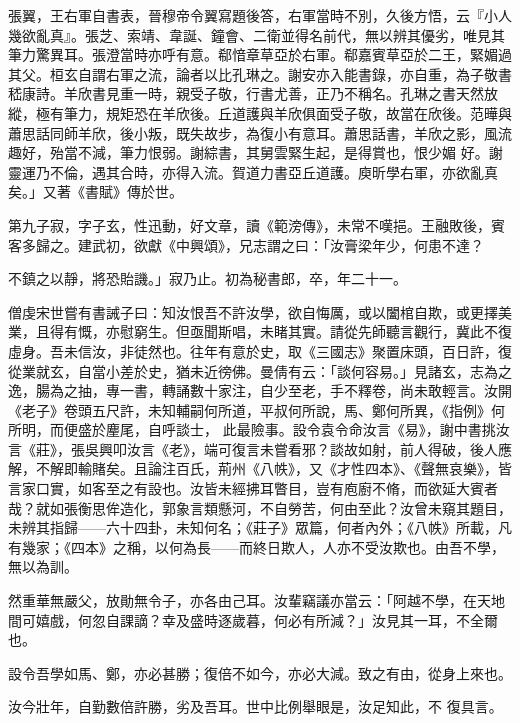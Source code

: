 \begin{pinyinscope}
 張翼，王右軍自書表，晉穆帝令翼寫題後答，右軍當時不別，久後方悟，云『小人幾欲亂真』。張芝、索靖、韋誕、鐘會、二衛並得名前代，無以辨其優劣，唯見其筆力驚異耳。張澄當時亦呼有意。郗愔章草亞於右軍。郗嘉賓草亞於二王，緊媚過其父。桓玄自謂右軍之流，論者以比孔琳之。謝安亦入能書錄，亦自重，為子敬書嵇康詩。羊欣書見重一時，親受子敬，行書尤善，正乃不稱名。孔琳之書天然放縱，極有筆力，規矩恐在羊欣後。丘道護與羊欣俱面受子敬，故當在欣後。范曄與蕭思話同師羊欣，後小叛，既失故步，為復小有意耳。蕭思話書，羊欣之影，風流趣好，殆當不減，筆力恨弱。謝綜書，其舅雲緊生起，是得賞也，恨少媚
 好。謝靈運乃不倫，遇其合時，亦得入流。賀道力書亞丘道護。庾昕學右軍，亦欲亂真矣。」又著《書賦》傳於世。



 第九子寂，字子玄，性迅動，好文章，讀《範滂傳》，未常不嘆挹。王融敗後，賓客多歸之。建武初，欲獻《中興頌》，兄志謂之曰：「汝膏梁年少，何患不達？



 不鎮之以靜，將恐貽譏。」寂乃止。初為秘書郎，卒，年二十一。



 僧虔宋世嘗有書誡子曰：知汝恨吾不許汝學，欲自悔厲，或以闔棺自欺，或更擇美業，且得有慨，亦慰窮生。但亟聞斯唱，未睹其實。請從先師聽言觀行，冀此不復虛身。吾未信汝，非徒然也。往年有意於史，取《三國志》聚置床頭，百日許，復從業就玄，自當小差於史，猶未近徬佛。曼倩有云：「談何容易。」見諸玄，志為之逸，腸為之抽，專一書，轉誦數十家注，自少至老，手不釋卷，尚未敢輕言。汝開《老子》卷頭五尺許，未知輔嗣何所道，平叔何所說，馬、鄭何所異，《指例》何所明，而便盛於麈尾，自呼談士，
 此最險事。設令袁令命汝言《易》，謝中書挑汝言《莊》，張吳興叩汝言《老》，端可復言未嘗看邪？談故如射，前人得破，後人應解，不解即輸賭矣。且論注百氏，荊州《八帙》，又《才性四本》、《聲無哀樂》，皆言家口實，如客至之有設也。汝皆未經拂耳瞥目，豈有庖廚不脩，而欲延大賓者哉？就如張衡思侔造化，郭象言類懸河，不自勞苦，何由至此？汝曾未窺其題目，未辨其指歸——六十四卦，未知何名；《莊子》眾篇，何者內外；《八帙》所載，凡有幾家；《四本》之稱，以何為長——而終日欺人，人亦不受汝欺也。由吾不學，無以為訓。



 然重華無嚴父，放勛無令子，亦各由己耳。汝輩竊議亦當云：「阿越不學，在天地間可嬉戲，何忽自課謫？幸及盛時逐歲暮，何必有所減？」汝見其一耳，不全爾也。



 設令吾學如馬、鄭，亦必甚勝；復倍不如今，亦必大減。致之有由，從身上來也。



 汝今壯年，自勤數倍許勝，劣及吾耳。世中比例舉眼是，汝足知此，不
 復具言。




\end{pinyinscope}
